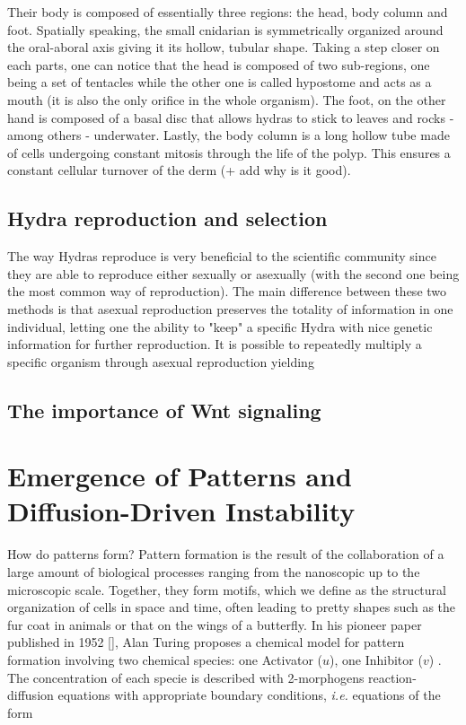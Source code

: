 Their body is composed of essentially three regions: the head, body column and foot. Spatially speaking, the small cnidarian is symmetrically organized around the oral-aboral axis giving it its hollow, tubular shape. Taking a step closer on each parts, one can notice that the head is composed of two sub-regions, one being a set of tentacles while the other one is called hypostome and acts as a mouth (it is also the only orifice in the whole organism). The foot, on the other hand is composed of a basal disc that allows hydras to stick to leaves and rocks - among others - underwater. Lastly, the body column is a long hollow tube made of cells undergoing constant mitosis through the life of the polyp. This ensures a constant cellular turnover of the derm (+ add why is it good). 

\subsection{Hydra reproduction and selection}

The way Hydras reproduce is very beneficial to the scientific community since they are able to reproduce either sexually or asexually (with the second one being the most common way of reproduction). The main difference between these two methods is that asexual reproduction preserves the totality of information in one individual, letting one the ability to "keep" a specific Hydra with nice genetic information for further reproduction. It is possible to repeatedly multiply a specific organism through asexual reproduction yielding   

\subsection{The importance of Wnt signaling}

\section{Emergence of Patterns and Diffusion-Driven Instability}
How do patterns form? Pattern formation is the result of the collaboration of a large amount of biological processes ranging from the nanoscopic up to the microscopic scale. Together, they form motifs, which we define as the structural organization of cells in space and time, often leading to pretty shapes such as the fur coat in animals or that on the wings of a butterfly. In his pioneer paper  published in 1952 [], Alan Turing proposes a chemical model for pattern formation involving two chemical species: one Activator ($u$), one Inhibitor ($v$) . The concentration of each specie is described with 2-morphogens reaction-diffusion equations with appropriate boundary conditions, \textit{i.e.} equations of the form 


